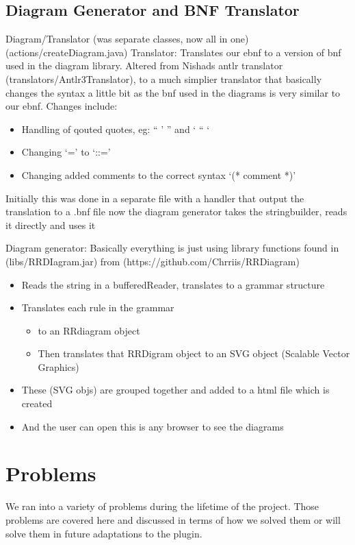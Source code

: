 \subsection{Diagram Generator and BNF Translator}
Diagram/Translator (was separate classes, now all in one) (actions/createDiagram.java)
Translator: Translates our ebnf to a version of bnf used in the diagram library.
Altered from Nishads antlr translator (translators/Antlr3Translator), to a much simplier translator that basically changes the syntax a little bit as the bnf used in the diagrams is very similar to our ebnf.
Changes include:
\begin{itemize}
\item Handling of qouted quotes, eg: “ ’ ” and ‘ “ ‘ 
\item Changing ‘=’ to ‘::=’
\item Changing added comments to the correct syntax ‘(* comment *)’ 
\end{itemize}
Initially this was done in a separate file with a handler that output the translation to a .bnf file now the diagram generator takes the stringbuilder, reads it directly and uses it

Diagram generator: Basically everything is just using library functions found in (libs/RRDIagram.jar) from  (https://github.com/Chrriis/RRDiagram)
\begin{itemize}
\item Reads the string in a bufferedReader, translates to a grammar structure
\item Translates each rule in the grammar 
	\begin{itemize}
	\item to an RRdiagram object
	\item Then translates that RRDigram object to an SVG object (Scalable Vector Graphics) 
	\end{itemize}
\item These (SVG objs) are grouped together and added to a html file which is created 
\item And the user can open this is any browser to see the diagrams 
\end{itemize}


\section{Problems}
We ran into a variety of problems during the lifetime of the project. Those problems are covered here and discussed in terms of how we solved them or will solve them in future adaptations to the plugin. 

